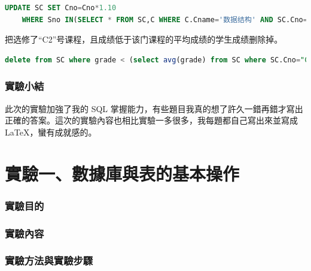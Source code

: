 \documentclass[12pt, a4paper]{report}
\begin{document}
\begin{lstlisting}[language=SQL]
    UPDATE SC SET Cno=Cno*1.10 
    WHERE Sno IN(SELECT * FROM SC,C WHERE C.Cname='数据结构' AND SC.Cno=C.Cno);
\end{lstlisting}

把选修了“C2”号课程，且成绩低于该门课程的平均成绩的学生成绩删除掉。\\

\begin{lstlisting}[language=SQL]
    delete from SC where grade < (select avg(grade) from SC where SC.Cno="C2");
\end{lstlisting}

\begin{figure}[H] %
    \centering %
\end{figure}

\section{實驗小結}

此次的實驗加強了我的 SQL 掌握能力，有些題目我真的想了許久一錯再錯才寫出正確的答案。這次的實驗內容也相比實驗一多很多，我每題都自己寫出來並寫成 LaTeX，蠻有成就感的。

\part{實驗一、數據庫與表的基本操作}

\section{實驗目的}



\section{實驗內容}

\section{實驗方法與實驗步驟}
\end{document}
